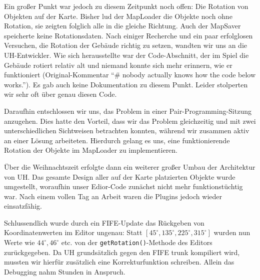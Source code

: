 Ein großer Punkt war jedoch zu diesem Zeitpunkt noch offen: Die Rotation von
Objekten auf der Karte.
Bisher lud der MapLoader die Objekte noch ohne Rotation, sie zeigten folglich
alle in die gleiche Richtung. Auch der MapSaver speicherte keine Rotationsdaten.
Nach einiger Recherche und ein paar erfolglosen Versuchen, die Rotation der
Gebäude richtig zu setzen, wandten wir uns an die UH-Entwickler.
Wie sich herausstellte war der Code-Abschnitt, der im Spiel die Gebäude rotiert
relativ alt und niemand konnte sich mehr erinnern, wie er funktioniert
(Original-Kommentar ``\# nobody actually knows how the code below works.'').
Es gab auch keine Dokumentation zu diesem Punkt. Leider stolperten wir sehr oft
über genau diesen Code.

Daraufhin entschlossen wir uns, das Problem in einer Pair-Programming-Sitzung anzugehen. Dies hatte
den Vorteil, dass wir das Problem gleichzeitig und mit zwei unterschiedlichen Sichtweisen betrachten
konnten, während wir zusammen aktiv an einer Lösung arbeiteten. Hierdurch gelang es uns, eine funktionierende
Rotation der Objekte im MapLoader zu implementieren.

Über die Weihnachtszeit erfolgte dann ein weiterer großer Umbau der Architektur
von UH. Das gesamte Design aller auf der Karte platzierten Objekte wurde
umgestellt, woraufhin unser Edior-Code zunächst nicht mehr funktionstüchtig war.
Nach einem vollen Tag an Arbeit waren die Plugins jedoch wieder einsatzfähig.


Schlussendlich wurde durch ein FIFE-Update das Rückgeben von Koordinatenwerten
im Editor ungenau: Statt $[45^\circ, 135^\circ, 225^\circ, 315^\circ]$ wurden
nun Werte wie $44^\circ, 46^\circ$ etc. von der {\tt getRotation()}-Methode des
Editors zurückgegeben. Da UH grundsätzlich gegen den FIFE trunk kompiliert wird,
mussten wir hierfür zusätzlich eine Korrekturfunktion schreiben. Allein das
Debugging nahm Stunden in Anspruch.


